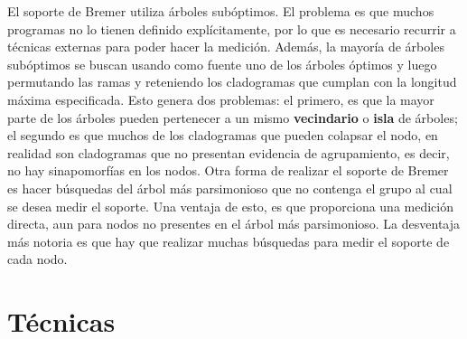 El soporte de Bremer utiliza \'arboles sub\'optimos. El problema es que muchos programas no lo tienen definido expl\'icitamente, por lo que es necesario recurrir a t\'ecnicas externas para poder hacer la medici\'on. Adem\'as, la mayor\'ia de \'arboles sub\'optimos se buscan usando como fuente uno de los \'arboles \'optimos y luego permutando las ramas y reteniendo los cladogramas que cumplan con la longitud m\'axima especificada. Esto genera dos problemas: el primero, es que la mayor parte de los \'arboles pueden pertenecer a un mismo \textbf{vecindario} o \textbf{isla} de \'arboles; el segundo es que muchos de los cladogramas que pueden colapsar el nodo, en realidad son cladogramas que no presentan evidencia de agrupamiento, es decir, no hay sinapomorf\'ias en los nodos. Otra forma de realizar el soporte de Bremer es hacer b\'usquedas del \'arbol m\'as parsimonioso que no contenga el grupo al cual se desea medir el soporte. Una ventaja de esto, es que proporciona una medici\'on directa, aun para nodos no presentes en el \'arbol m\'as parsimonioso. La desventaja m\'as notoria es que hay que realizar muchas b\'usquedas para medir el soporte de cada nodo.



\section*{T\'ecnicas}

